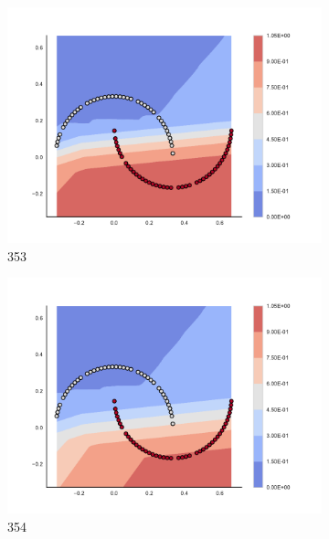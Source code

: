 \begin{figure}[h]
\begin{subfigure}[b]{0.09\textwidth}
    \includegraphics[clip, trim=2.35cm 1.75cm 4.5cm 0cm,width=\textwidth]{img/convergence/353.pdf}
    \caption{353}
    \label{fig:convergence_353}
\end{subfigure}
%
\begin{subfigure}[b]{0.09\textwidth}
    \includegraphics[clip, trim=2.35cm 1.75cm 4.5cm 0cm,width=\textwidth]{img/convergence/354.pdf}
    \caption{354}
    \label{fig:convergence_354}
\end{subfigure}
%
\begin{subfigure}[b]{0.09\textwidth}

\end{subfigure}
\end{figure}
